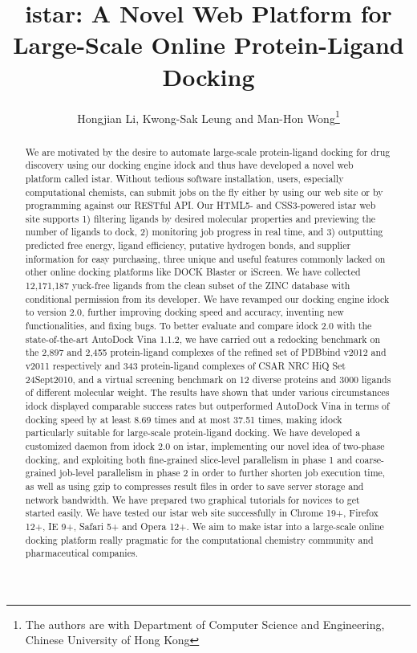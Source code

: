 \documentclass[12pt]{article}
\title{istar: A Novel Web Platform for Large-Scale Online Protein-Ligand Docking}
\author{Hongjian Li, Kwong-Sak Leung and Man-Hon Wong\thanks{The authors are with Department of Computer Science and Engineering, Chinese University of Hong Kong}}
\begin{document}
\maketitle

\begin{abstract}
We are motivated by the desire to automate large-scale protein-ligand docking for drug discovery using our docking engine idock and thus have developed a novel web platform called istar. Without tedious software installation, users, especially computational chemists, can submit jobs on the fly either by using our web site or by programming against our RESTful API. Our HTML5- and CSS3-powered istar web site supports 1) filtering ligands by desired molecular properties and previewing the number of ligands to dock, 2) monitoring job progress in real time, and 3) outputting predicted free energy, ligand efficiency, putative hydrogen bonds, and supplier information for easy purchasing, three unique and useful features commonly lacked on other online docking platforms like DOCK Blaster or iScreen. We have collected 12,171,187 yuck-free ligands from the clean subset of the ZINC database with conditional permission from its developer. We have revamped our docking engine idock to version 2.0, further improving docking speed and accuracy, inventing new functionalities, and fixing bugs. To better evaluate and compare idock 2.0 with the state-of-the-art AutoDock Vina 1.1.2, we have carried out a redocking benchmark on the 2,897 and 2,455 protein-ligand complexes of the refined set of PDBbind v2012 and v2011 respectively and 343 protein-ligand complexes of CSAR NRC HiQ Set 24Sept2010, and a virtual screening benchmark on 12 diverse proteins and 3000 ligands of different molecular weight. The results have shown that under various circumstances idock displayed comparable success rates but outperformed AutoDock Vina in terms of docking speed by at least 8.69 times and at most 37.51 times, making idock particularly suitable for large-scale protein-ligand docking. We have developed a customized daemon from idock 2.0 on istar, implementing our novel idea of two-phase docking, and exploiting both fine-grained slice-level parallelism in phase 1 and coarse-grained job-level parallelism in phase 2 in order to further shorten job execution time, as well as using gzip to compresses result files in order to save server storage and network bandwidth. We have prepared two graphical tutorials for novices to get started easily. We have tested our istar web site successfully in Chrome 19+, Firefox 12+, IE 9+, Safari 5+ and Opera 12+. We aim to make istar into a large-scale online docking platform really pragmatic for the computational chemistry community and pharmaceutical companies.
\end{abstract}
\end{document}
